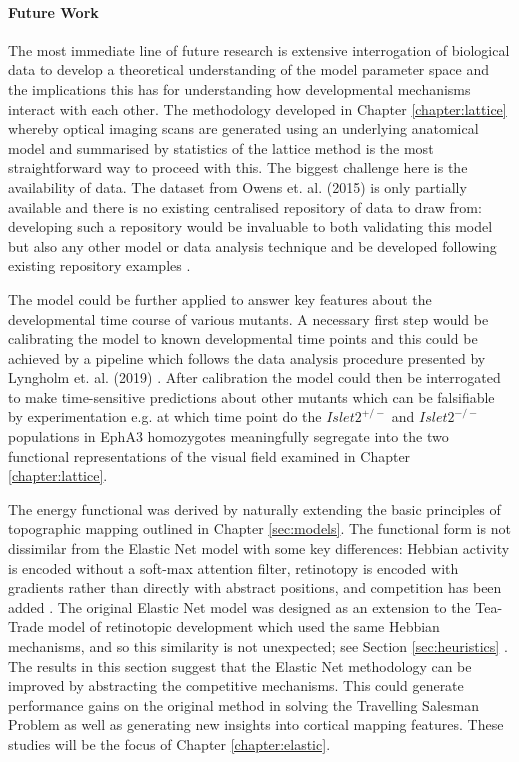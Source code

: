 \paragraph{Future Work}
The most immediate line of future research is extensive interrogation of biological data to develop a theoretical understanding of the model parameter space and the implications this has for understanding how developmental mechanisms interact with each other. The methodology developed in Chapter \ref{chapter:lattice} whereby optical imaging scans are generated using an underlying anatomical model and summarised by statistics of the lattice method is the most straightforward way to proceed with this. The biggest challenge here is the availability of data. The dataset from Owens et. al. (2015) is only partially available and there is no existing centralised repository of data to draw from: developing such a repository would be invaluable to both validating this model but also any other model or data analysis technique and be developed following existing repository examples \cite{Owens2015-zv, Eglen2014-fo}. 

The model could be further applied to answer key features about the developmental time course of various mutants. A necessary first step would be calibrating the model to known developmental time points and this could be achieved by a pipeline which follows the data analysis procedure presented by Lyngholm et. al. (2019) \cite{Lyngholm2019-fs}. After calibration the model could then be interrogated to make time-sensitive predictions about other mutants which can be falsifiable by experimentation e.g. at which time point do the $Islet2^{+/-}$ and $Islet2^{-/-}$ populations in EphA3 homozygotes meaningfully segregate into the two functional representations of the visual field examined in Chapter \ref{chapter:lattice}. 

The energy functional was derived by naturally extending the basic principles of topographic mapping outlined in Chapter \ref{sec:models}. The functional form is not dissimilar from the Elastic Net model with some key differences: Hebbian activity is encoded without a soft-max attention filter, retinotopy is encoded with gradients rather than directly with abstract positions, and competition has been added \cite{Durbin1987-ki, Durbin1990-tn}. The original Elastic Net model was designed as an extension to the Tea-Trade model of retinotopic development which used the same Hebbian mechanisms, and so this similarity is not unexpected; see Section \ref{sec:heuristics} \cite{Durbin1987-ki, Willshaw1976-ew}. The results in this section suggest that the Elastic Net methodology can be improved by abstracting the competitive mechanisms. This could generate performance gains on the original method in solving the Travelling Salesman Problem as well as generating new insights into cortical mapping features. These studies will be the focus of Chapter \ref{chapter:elastic}.

